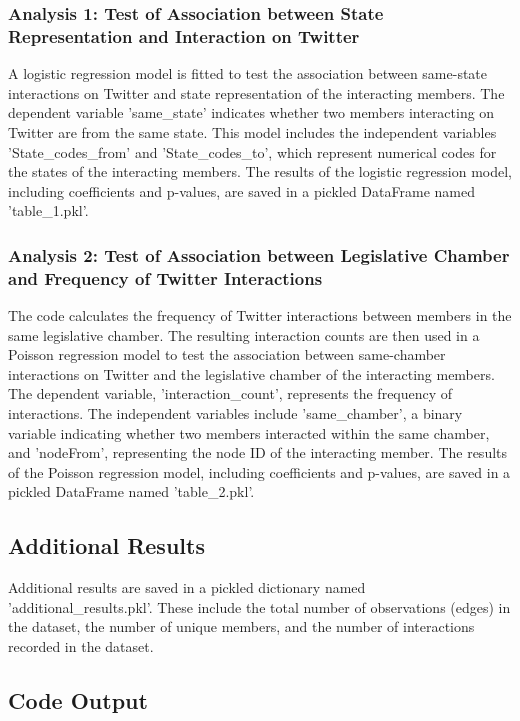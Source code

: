 \documentclass[11pt]{article}
\begin{document}
\subsubsection{Analysis 1: Test of Association between State Representation and Interaction on Twitter}
A logistic regression model is fitted to test the association between same-state interactions on Twitter and state representation of the interacting members. The dependent variable 'same\_state' indicates whether two members interacting on Twitter are from the same state. This model includes the independent variables 'State\_codes\_from' and 'State\_codes\_to', which represent numerical codes for the states of the interacting members. The results of the logistic regression model, including coefficients and p-values, are saved in a pickled DataFrame named 'table\_1.pkl'.

\subsubsection{Analysis 2: Test of Association between Legislative Chamber and Frequency of Twitter Interactions}
The code calculates the frequency of Twitter interactions between members in the same legislative chamber. The resulting interaction counts are then used in a Poisson regression model to test the association between same-chamber interactions on Twitter and the legislative chamber of the interacting members. The dependent variable, 'interaction\_count', represents the frequency of interactions. The independent variables include 'same\_chamber', a binary variable indicating whether two members interacted within the same chamber, and 'nodeFrom', representing the node ID of the interacting member. The results of the Poisson regression model, including coefficients and p-values, are saved in a pickled DataFrame named 'table\_2.pkl'.

\subsection{Additional Results}
Additional results are saved in a pickled dictionary named 'additional\_results.pkl'. These include the total number of observations (edges) in the dataset, the number of unique members, and the number of interactions recorded in the dataset.

\subsection{Code Output}\hypertarget{file-table-1-pkl}{}
\end{document}
